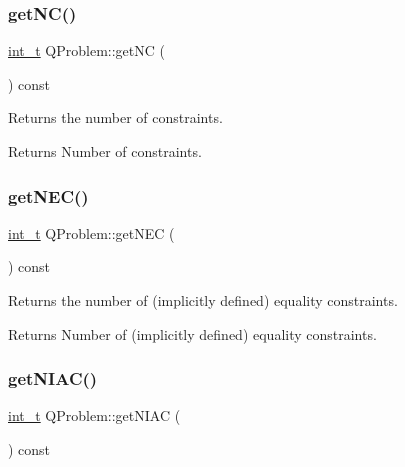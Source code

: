 \subsubsection{\texorpdfstring{get\+N\+C()}{getNC()}}
{\footnotesize\ttfamily \hyperlink{_types_8hpp_ab6fd6105e64ed14a0c9281326f05e623}{int\+\_\+t} Q\+Problem\+::get\+NC (\begin{DoxyParamCaption}{ }\end{DoxyParamCaption}) const\hspace{0.3cm}{\ttfamily [inline]}}

Returns the number of constraints. \begin{DoxyReturn}{Returns}
Number of constraints. 
\end{DoxyReturn}
\mbox{\label{class_q_problem_a4dfed2d15c76d5d6b3d904feb1d081c4}} 
\subsubsection{\texorpdfstring{get\+N\+E\+C()}{getNEC()}}
{\footnotesize\ttfamily \hyperlink{_types_8hpp_ab6fd6105e64ed14a0c9281326f05e623}{int\+\_\+t} Q\+Problem\+::get\+N\+EC (\begin{DoxyParamCaption}{ }\end{DoxyParamCaption}) const\hspace{0.3cm}{\ttfamily [inline]}}

Returns the number of (implicitly defined) equality constraints. \begin{DoxyReturn}{Returns}
Number of (implicitly defined) equality constraints. 
\end{DoxyReturn}
\mbox{\label{class_q_problem_ac53a0fa59013e0b598eb1a14e0d4ffd5}} 
\subsubsection{\texorpdfstring{get\+N\+I\+A\+C()}{getNIAC()}}
{\footnotesize\ttfamily \hyperlink{_types_8hpp_ab6fd6105e64ed14a0c9281326f05e623}{int\+\_\+t} Q\+Problem\+::get\+N\+I\+AC (\begin{DoxyParamCaption}{ }\end{DoxyParamCaption}) const\hspace{0.3cm}{\ttfamily [inline]}}

